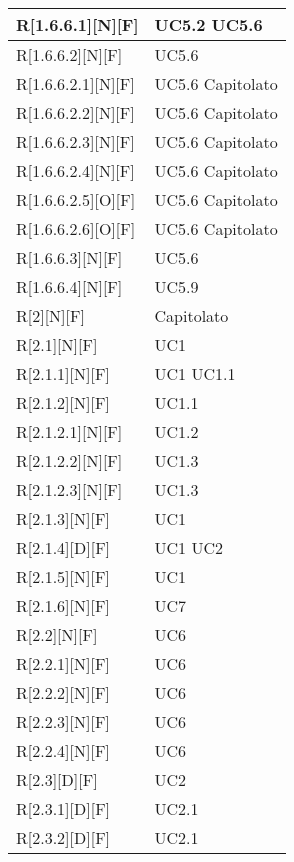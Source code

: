 \begin{longtable}{X | X}
\hline
R[1.6.6.1][N][F] & UC5.2 \newline UC5.6 \\
\hline
R[1.6.6.2][N][F] & UC5.6 \\
\hline
R[1.6.6.2.1][N][F] & UC5.6 \newline Capitolato \\
\hline
R[1.6.6.2.2][N][F] & UC5.6 \newline Capitolato \\
\hline
R[1.6.6.2.3][N][F] & UC5.6 \newline Capitolato \\
\hline
R[1.6.6.2.4][N][F] & UC5.6 \newline Capitolato \\
\hline
R[1.6.6.2.5][O][F] & UC5.6 \newline Capitolato \\
\hline
R[1.6.6.2.6][O][F] & UC5.6 \newline Capitolato \\
\hline
R[1.6.6.3][N][F] & UC5.6 \\
\hline
R[1.6.6.4][N][F] & UC5.9 \\
\hline
R[2][N][F] & Capitolato \\
\hline
R[2.1][N][F] & UC1 \\
\hline
R[2.1.1][N][F] & UC1 \newline UC1.1 \\
\hline
R[2.1.2][N][F] & UC1.1 \\
\hline
R[2.1.2.1][N][F] & UC1.2 \\
\hline
R[2.1.2.2][N][F] & UC1.3 \\
\hline
R[2.1.2.3][N][F] & UC1.3 \\
\hline
R[2.1.3][N][F] & UC1 \\
\hline
R[2.1.4][D][F] & UC1 \newline UC2 \\
\hline
R[2.1.5][N][F] & UC1 \\
\hline
R[2.1.6][N][F] & UC7 \\
\hline
R[2.2][N][F] & UC6 \\
\hline
R[2.2.1][N][F] & UC6 \\
\hline
R[2.2.2][N][F] & UC6 \\
\hline
R[2.2.3][N][F] & UC6 \\
\hline
R[2.2.4][N][F] & UC6 \\
\hline
R[2.3][D][F] & UC2 \\
\hline
R[2.3.1][D][F] & UC2.1 \\
\hline
R[2.3.2][D][F] & UC2.1 \\

\end{longtable}
